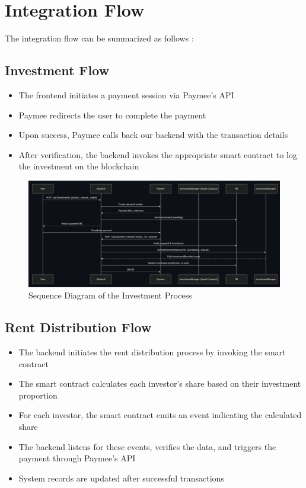 \section{Integration Flow}

The integration flow can be summarized as follows \cite{Casino2019BlockchainApplications}:

\subsection{Investment Flow}

\begin{itemize}
    \item The frontend initiates a payment session via Paymee's API
    \item Paymee redirects the user to complete the payment
    \item Upon success, Paymee calls back our backend with the transaction details
    \item After verification, the backend invokes the appropriate smart contract to log the investment on the blockchain
\end{itemize}

\begin{figure}[htbp]
  \centering
  \includegraphics[width=\textwidth]{images/investment_sequence.png}
  \caption{Sequence Diagram of the Investment Process}
  \label{fig:investment-sequence}
\end{figure}

\subsection{Rent Distribution Flow}

\begin{itemize}
    \item The backend initiates the rent distribution process by invoking the smart contract
    \item The smart contract calculates each investor's share based on their investment proportion
    \item For each investor, the smart contract emits an event indicating the calculated share
    \item The backend listens for these events, verifies the data, and triggers the payment through Paymee's API
    \item System records are updated after successful transactions
\end{itemize}

